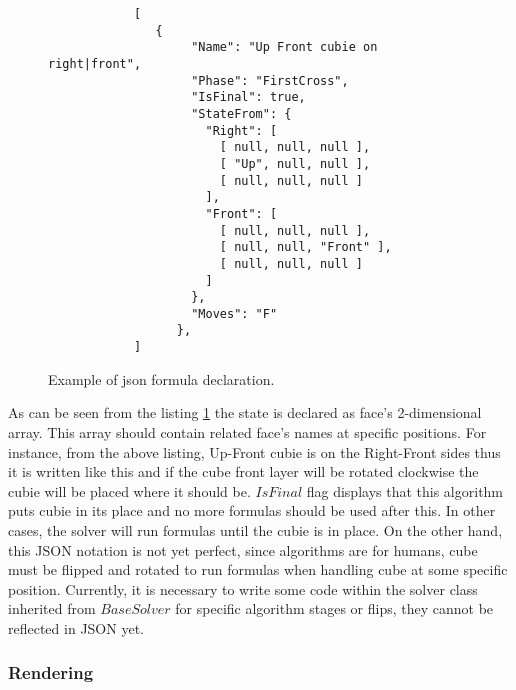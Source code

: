 \documentclass[../../main.tex]{subfiles}
\begin{document}
\begin{figure} [!ht]
  \centering    
    \lstset{style=sharpc}
        \begin{lstlisting}
            [
               {
                    "Name": "Up Front cubie on right|front",
                    "Phase": "FirstCross",
                    "IsFinal": true,
                    "StateFrom": {
                      "Right": [
                        [ null, null, null ],
                        [ "Up", null, null ],
                        [ null, null, null ]
                      ],
                      "Front": [
                        [ null, null, null ],
                        [ null, null, "Front" ],
                        [ null, null, null ]
                      ]
                    },
                    "Moves": "F"
                  },
            ]     
        \end{lstlisting}
  \caption{Example of json formula declaration.}
  \label{jsonsolformuladecl}
\end{figure}

As can be seen from the listing \ref{jsonsolformuladecl} the state is declared as face's 2-dimensional array. This array should contain related face's names at specific positions. For instance, from the above listing, Up-Front cubie is on the Right-Front sides thus it is written like this and if the cube front layer will be rotated clockwise the cubie will be placed where it should be. $IsFinal$ flag displays that this algorithm puts cubie in its place and no more formulas should be used after this. In other cases, the solver will run formulas until the cubie is in place.
On the other hand, this \ac{JSON} notation is not yet perfect, since algorithms are for humans, cube must be flipped and rotated to run formulas when handling cube at some specific position. Currently, it is necessary to write some code within the solver class inherited from $BaseSolver$ for specific algorithm stages or flips, they cannot be reflected in \ac{JSON} yet.

\subsubsection*{Rendering}
\end{document}
